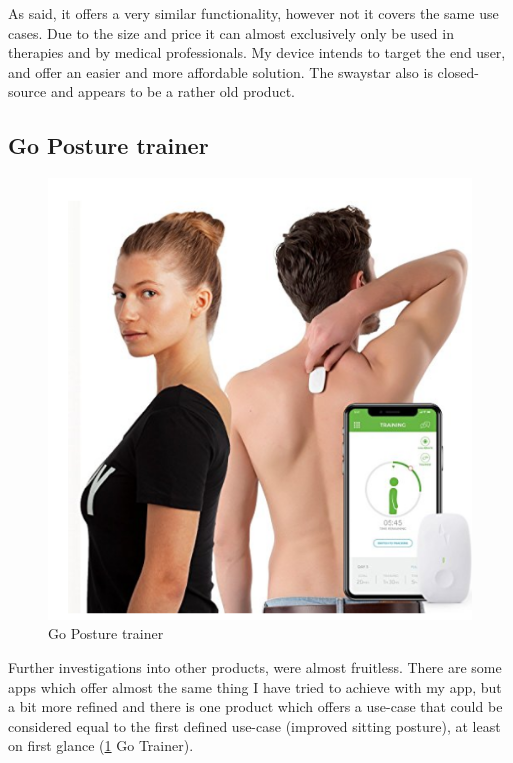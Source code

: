 As said, it offers a very similar functionality, however not it covers the same use cases. Due to the size and price it can almost exclusively only be used in therapies and by medical professionals. My device intends to target the end user, and offer an easier and more affordable solution. The swaystar also is closed-source and appears to be a rather old product.
\cite{SwayStar47:online}

\subsection{Go Posture trainer}

\begin{figure}
  \begin{center}
\includegraphics[width=\linewidth]{images/Screenshot_3.png}
  \end{center}
  \caption{Go Posture trainer}
  \label{fig:gotrainer}
\end{figure}

Further investigations into other products, were almost fruitless. There are some apps which offer almost the same thing I have tried to achieve with my app, but a bit more refined and there is one product which offers a use-case that could be considered equal to the first defined use-case (improved sitting posture), at least on first glance (\ref{fig:gotrainer} Go Trainer). 

